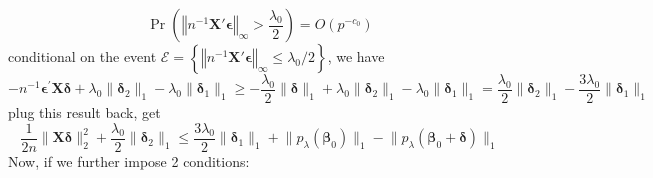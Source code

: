 \documentclass[twoside]{article}
\begin{document}
$$
\Pr \left( \left\Vert n^{-1}\mathbf{X}'\boldsymbol{\epsilon}  \right\Vert _{\infty} >\frac{\lambda_0}{2} \right) = O\left(p^{-c_0}\right)
$$
conditional on the event $\mathcal{E} = \left\{ \left\Vert n^{-1}\mathbf{X}'\boldsymbol{\epsilon}  \right\Vert _{\infty}\leq \lambda_0 /2 \right\}$, we have 
$$
 - n^{-1}\boldsymbol{\epsilon}^{\prime}\mathbf{X}\boldsymbol{\delta} + \lambda_0\lVert \boldsymbol{\delta}_2 \rVert _1 - \lambda_0 \lVert \boldsymbol{\delta}_1 \rVert _1 \geq -\frac{\lambda_0}{2}\lVert \boldsymbol{\delta} \rVert _1 + \lambda_0\lVert \boldsymbol{\delta}_2 \rVert _1 - \lambda_0 \lVert \boldsymbol{\delta}_1 \rVert _1 = \frac{\lambda_0}{2} \lVert \boldsymbol{\delta}_2 \rVert _1 - \frac{3\lambda_0}{2} \lVert \boldsymbol{\delta}_1 \rVert _1
$$
plug this result back, get
\begin{equation}\label{eq:basic_constrant_step1}
    \frac{1}{2n}\lVert \mathbf{X}\boldsymbol{\delta} \rVert ^2_2 + \frac{\lambda_0}{2} \lVert \boldsymbol{\delta}_2 \rVert _1 \leq \frac{3\lambda_0}{2} \lVert \boldsymbol{\delta}_1 \rVert _1+ \lVert p_{\lambda}({\boldsymbol{\beta}_0}) \rVert _1 -  \lVert p_{\lambda}( \boldsymbol{\beta}_0+\boldsymbol{\delta}) \rVert _1 
\end{equation}
Now, if we further impose 2 conditions:
\end{document}
